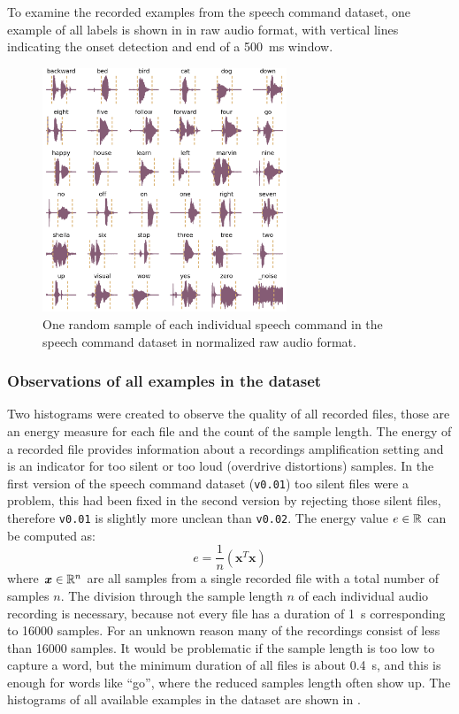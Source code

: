 To examine the recorded examples from the speech command dataset, one example of all labels is shown in  in raw audio format, with vertical lines indicating the onset detection and end of a \SI{500}{\milli\second} window.
\begin{figure}[!ht]
  \centering
    \includegraphics[width=0.65\textwidth]{./5_exp/figs/exp_dataset_speech_cmd_wav_grid.png}
  \caption{One random sample of each individual speech command in the speech command dataset in normalized raw audio format.}
  \label{fig:exp_dataset_speech_cmd_wav_grid}
\end{figure}
\FloatBarrier
\noindent



\subsubsection{Observations of all examples in the dataset}
Two histograms were created to observe the quality of all recorded files, those are an energy measure for each file and the count of the sample length.
The energy of a recorded file provides information about a recordings amplification setting and is an indicator for too silent or too loud (overdrive distortions) samples. 
In the first version of the speech command dataset (\texttt{v0.01}) too silent files were a problem, this had been fixed in the second version by rejecting those silent files, therefore \texttt{v0.01} is slightly more unclean than \texttt{v0.02}.
The energy value $e \in \mathbb{R}$ can be computed as:
\begin{equation}\label{eq:exp_dataset_energy}
  e = \frac{1}{n} \left( \bm{x}^T \bm{x} \right)
\end{equation}
where $\bm{x} \in \mathbb{R}^n$ are all samples from a single recorded file with a total number of samples $n$.
The division through the sample length $n$ of each individual audio recording is necessary, because not every file has a duration of \SI{1}{\second} corresponding to 16000 samples.
For an unknown reason many of the recordings consist of less than 16000 samples.
It would be problematic if the sample length is too low to capture a word, but the minimum duration of all files is about \SI{0.4}{\second}, and this is enough for words like \enquote{go}, where the reduced samples length often show up.
The histograms of all available examples in the dataset are shown in .


